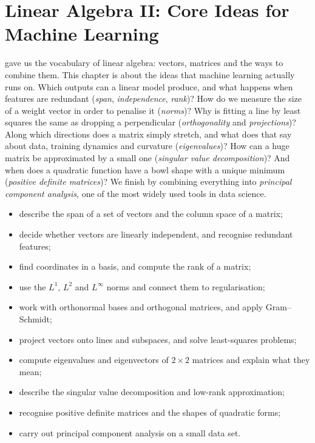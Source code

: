 \chapter{Linear Algebra II: Core Ideas for Machine Learning}\label{ch:linalg2}

\begin{motivation}
 gave us the vocabulary of linear algebra: vectors, matrices
and the ways to combine them. This chapter is about the ideas that machine
learning actually runs on. Which outputs can a linear model produce, and what
happens when features are redundant (\emph{span}, \emph{independence},
\emph{rank})? How do we measure the size of a weight vector in order to
penalise it (\emph{norms})? Why is fitting a line by least squares the same as
dropping a perpendicular (\emph{orthogonality} and \emph{projections})? Along
which directions does a matrix simply stretch, and what does that say about
data, training dynamics and curvature (\emph{eigenvalues})? How can a huge
matrix be approximated by a small one (\emph{singular value decomposition})?
And when does a quadratic function have a bowl shape with a unique minimum
(\emph{positive definite matrices})? We finish by combining everything into
\emph{principal component analysis}, one of the most widely used tools in
data science.
\end{motivation}

\begin{objectives}
\begin{itemize}
  \item describe the span of a set of vectors and the column space of a matrix;
  \item decide whether vectors are linearly independent, and recognise
    redundant features;
  \item find coordinates in a basis, and compute the rank of a matrix;
  \item use the $L^1$, $L^2$ and $L^\infty$ norms and connect them to
    regularisation;
  \item work with orthonormal bases and orthogonal matrices, and apply
    Gram--Schmidt;
  \item project vectors onto lines and subspaces, and solve least-squares
    problems;
  \item compute eigenvalues and eigenvectors of $2\times2$ matrices and explain
    what they mean;
  \item describe the singular value decomposition and low-rank approximation;
  \item recognise positive definite matrices and the shapes of quadratic forms;
  \item carry out principal component analysis on a small data set.
\end{itemize}
\end{objectives}

